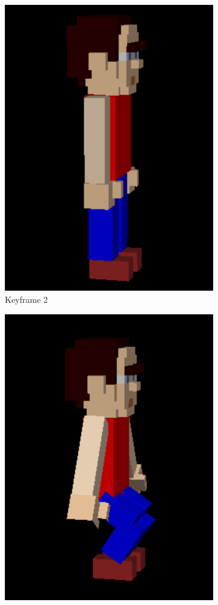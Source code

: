 \documentclass[12pt]{article}
\begin{document}
\begin{figure}[h]
\begin{subfigure}{.33\textwidth}
  \includegraphics[width=.9\linewidth]{2}
  \caption{Keyframe 2}
  \label{fig:key2}
\end{subfigure}%
\begin{subfigure}{.33\textwidth}
  \centering
  \includegraphics[width=.9\linewidth]{3}

\end{subfigure}
\end{figure}
\end{document}
